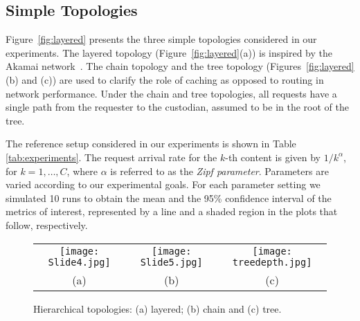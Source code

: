 
\subsection{Simple Topologies}

\label{sec:simpletop}

Figure~\ref{fig:layered} presents the three simple topologies considered in our experiments.  
The layered topology (Figure~\ref{fig:layered}(a)) is inspired  by the Akamai network~\cite{sitaraman2014overlay}.  
The chain topology and the tree topology (Figures~\ref{fig:layered}(b) and (c)) are used to clarify the 
role of caching as opposed to routing in network performance.  Under the chain and tree topologies, 
all requests have a single path from the requester to the custodian, assumed to be in the root of the tree.



The reference setup considered  in our experiments is shown in Table \ref{tab:experiments}.  
The request arrival rate for the $k$-th content is given by $1/k^\alpha$, for $k=1, \ldots, C$, where $\alpha$ is referred to as the \emph{Zipf parameter}. 
Parameters are varied according to our experimental goals.  
For each parameter setting we simulated 10 runs to obtain the mean and the  95\% confidence interval 
of the metrics of interest, represented by
 a line and a shaded region in the plots that follow, respectively.  
  



\setlength{\tabcolsep}{0pt} 
\begin{figure}[h]
\begin{tabular}{c@{\hskip 0pt}c@{\hskip 0pt}c}
	\texttt{[image: Slide4.jpg]} & 
\hspace{-0.3in}		\texttt{[image: Slide5.jpg]} &
\hspace{-0.5in}	\texttt{[image: treedepth.jpg]} \\
(a) & \hspace{-0.3in}	(b) & \hspace{-0.5in}	(c) 
\end{tabular}
\vspace{-0.1in}
\caption{Hierarchical topologies: (a) layered; (b) chain and (c) tree. }
\label{fig:layered} \label{fig:chain}
\label{fig:treedepthtopology}
\end{figure}

